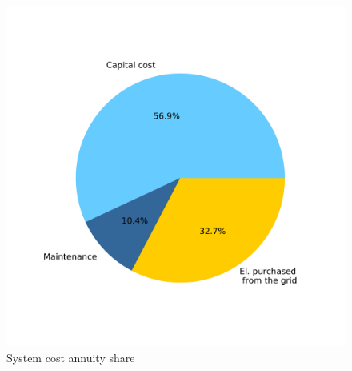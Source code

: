 \documentclass[english]{SPFShortReport}
\begin{document}
\begin{figure}[!htbp]
\begin{center}
\includegraphics[width=1\textwidth]{costShareAnnuity-HydD_mfb30_ideal_dryN-CityBAS_dryNAc1.0x35.659Vice0.4x35.659HP1.0x17.109-Year0.pdf}
\caption{System cost annuity share}
\label{systemCostannuity}
\end{center}
\end{figure}
\end{document}
